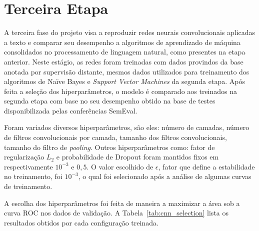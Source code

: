 \section{Terceira Etapa}

A terceira fase do projeto visa a reproduzir redes neurais convolucionais aplicadas a texto e comparar seu desempenho
a algoritmos de aprendizado de máquina consolidados no processamento de linguagem natural, como presentes na etapa
anterior.
Neste estágio, as redes foram treinadas com dados provindos da base anotada por supervisão distante, mesmos dados
utilizados para treinamento dos algoritmos de Naïve Bayes e \textit{Support Vector Machines} da segunda etapa.
Após feita a seleção dos hiperparâmetros, o modelo é comparado aos treinados na segunda etapa com base no seu
desempenho obtido na base de testes disponibilizada pelas conferências SemEval.

Foram variados diversos hiperparâmetros, são eles: número de camadas, número de filtros convolucionais por camada,
tamanho dos filtros convolucionais, tamanho do filtro de \textit{pooling}.
Outros hiperparâmetros como: fator de regularização $L_{2}$ e probabilidade de Dropout foram mantidos fixos em
respectivamente $10^{-3}$ e $0,5$.
O valor escolhido de $\epsilon$, fator que define a estabilidade no treinamento, foi $10^{-3}$, o qual foi selecionado
após a análise de algumas curvas de treinamento.

A escolha dos hiperparâmetros foi feita de maneira a maximizar a área sob a curva ROC nos dados de validação.
A Tabela~\ref{tab:cnn_selection} lista os resultados obtidos por cada configuração treinada.

